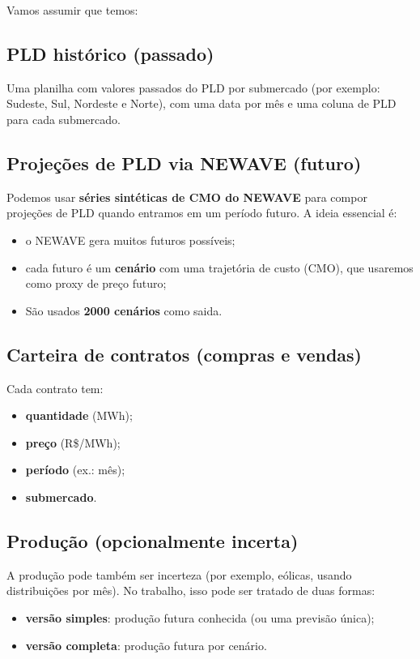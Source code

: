 \documentclass{article}
\begin{document}
Vamos assumir que temos:

\subsection{PLD histórico (passado)}
Uma planilha com valores passados do PLD por submercado (por exemplo: Sudeste, Sul, Nordeste e Norte),
com uma data por mês e uma coluna de PLD para cada submercado.

\subsection{Projeções de PLD via NEWAVE (futuro)}
Podemos usar \textbf{séries sintéticas de CMO do NEWAVE} para compor projeções
de PLD quando entramos em um período futuro.
A ideia essencial é:
\begin{itemize}
    \item o NEWAVE gera muitos futuros possíveis;
    \item cada futuro é um \textbf{cenário} com uma trajetória de custo (CMO), que usaremos como proxy de preço futuro;
    \item São usados \textbf{2000 cenários} como saida.
\end{itemize}

\subsection{Carteira de contratos (compras e vendas)}
Cada contrato tem:
\begin{itemize}
    \item \textbf{quantidade} (MWh);
    \item \textbf{preço} (R\$/MWh);
    \item \textbf{período} (ex.: mês);
    \item \textbf{submercado}.
\end{itemize}

\subsection{Produção (opcionalmente incerta)}
A produção pode também ser incerteza (por exemplo, eólicas, usando distribuições por mês).
No trabalho, isso pode ser tratado de duas formas:
\begin{itemize}
    \item \textbf{versão simples}: produção futura conhecida (ou uma previsão única);
    \item \textbf{versão completa}: produção futura por cenário.
\end{itemize}
\end{document}
